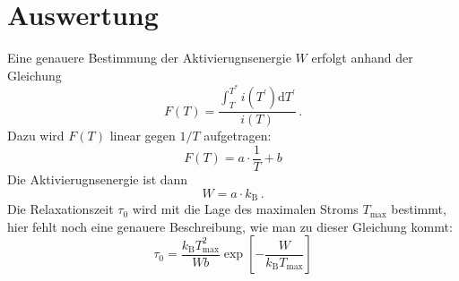 \section{Auswertung}

Eine genauere Bestimmung der Aktivierugnsenergie $W$ erfolgt anhand der Gleichung
\begin{equation*}
    F(T) = \frac{\int_T^{T^\ast} i(T^\prime)\mathrm{d}T^\prime}{i(T)}\,.
\end{equation*}
Dazu wird $F(T)$ linear gegen $1/T$ aufgetragen:
\begin{equation*}
    F(T) = a \cdot\frac{1}{T} + b
\end{equation*}
Die Aktivierugnsenergie ist dann
\begin{equation*}
    W = a \cdot k_\text{B}\,.
\end{equation*}
Die Relaxationszeit $\tau_0$ wird mit die Lage des maximalen Stroms $T_\text{max}$ bestimmt, hier fehlt noch eine genauere Beschreibung, wie man zu dieser Gleichung kommt:
\begin{equation}
    \label{eqn:tau0}
    \tau_0 = \frac{k_\text{B}T_\text{max}^2}{Wb}
             \exp\!\left[-\frac{W}{k_\text{B}T_\text{max}} \right]
\end{equation}
